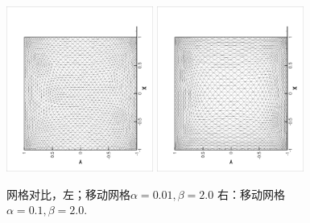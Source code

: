 \documentclass{report}
\theoremstyle{Remark}
\begin{document}
          \begin{figure}[ht]
            \begin{center}
              \includegraphics[width = 0.43\textwidth, angle =
              -90]{../picture_collidingFlow/moving_mesh20_vs001.eps}
              \includegraphics[width = 0.43\textwidth, angle =
              -90]{../picture_collidingFlow/moving_mesh20_vs01.eps}
              \caption{\small 网格对比，左；移动网格$\alpha = 0.01,
                \beta = 2.0$ 右：移动网格 $\alpha = 0.1, \beta = 2.0$.}
              \label{fig::uniform_vs_moving_mesh1}
            \end{center}
          \end{figure}
\end{document}
